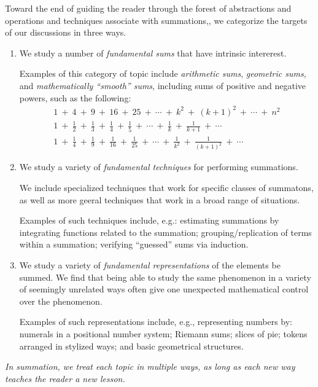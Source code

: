 Toward the end of guiding the reader through the forest of
abstractions and operations and techniques associate with summations,,
we categorize the targets of our discussions in three ways.
\begin{enumerate}
\item
We study a number of {\it fundamental sums} that have intrinsic
intererest.

Examples of this category of topic include {\it arithmetic sums}, {\it
  geometric sums}, and {\it mathematically ``smooth'' sums}, including
sums of positive and negative powers, such as the following:
\[
\begin{array}{l}
1 \ + \ 4 \ + \ 9 \ + \ 16 \ + \ 25 \ + \ \cdots \ + \ k^2  \ + \ (k+1)^2 \ +
\ \cdots \ + \ n^2 \\
1 \ + \ \frac{1}{2} \ + \ \frac{1}{3} \ + \ \frac{1}{4} \ +
\ \frac{1}{5} \ + \ \cdots \ + \ \frac{1}{k}  \ + \ \frac{1}{k+1} \ +
\ \cdots \\
1 \ + \ \frac{1}{4} \ + \ \frac{1}{9} \ + \ \frac{1}{16} \ +
\ \frac{1}{25} \ + \ \cdots \ + \ \frac{1}{k^2}  \ + \ \frac{1}{(k+1)^2} \ +
\ \cdots
\end{array}
\]


\item
We study a variety of {\it fundamental techniques} for performing
summations.

We include specialized techniques that work for specific classes of
summatons, as well as more geeral techniques that work in a broad
range of situations.

Examples of such techniques include, e.g.: estimating summations by
integrating functions related to the summation; grouping/replication
of terms within a summation; verifying ``guessed'' sums via induction.

\item
We study a variety of {\it fundamental representations} of the
elements be summed.  We find that being able to study the same
phenomenon in a variety of seemingly unrelated ways often give one
unexpected mathematical control over the phenomenon.

Examples of such representations include, e.g., representing numbers
by: numerals in a positional number system; Riemann sums; slices of
pie; tokens arranged in stylized ways; and basic geometrical
structures.
\end{enumerate}

{\em In summation, we treat each topic in multiple ways, as long as
  each new way teaches the reader a new lesson.}

